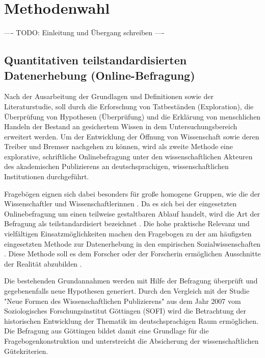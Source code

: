 \section{Methodenwahl}

---- TODO: Einleitung und Übergang schreiben ----

\subsection{Quantitativen teilstandardisierten Datenerhebung (Online-Befragung)}

Nach der Ausarbeitung der Grundlagen und Definitionen sowie der Literaturstudie, soll durch die Erforschung von Tatbeständen (Exploration), die Überprüfung von Hypothesen (Überprüfung) \cite{raab_2012_fragebogen} und die Erklärung von menschlichen Handeln \cite{atteslander_2008_methoden} der Bestand an gesichertem Wissen in dem Untersuchungsbereich erweitert \cite{bortz_Doering_2006_fragestellung} werden. Um der Entwicklung der Öffnung von Wissenschaft sowie deren Treiber und Bremser nachgehen zu können, wird als zweite Methode eine explorative, schriftliche Onlinebefragung unter den wissenschaftlichen Akteuren des akademischen Publizierens an deutschsprachigen, wissenschaftlichen Institutionen durchgeführt.

Fragebögen eignen sich dabei besonders für große homogene Gruppen, wie die der Wissenschaftler und Wissenschaftlerinnen \cite{suchen}. Da es sich bei der eingesetzten Onlinebefragung um einen teilweise gestaltbaren Ablauf handelt, wird die Art der Befragung als teilstandardisiert bezeichnet \cite{raab_2012_fragebogen}. Die hohe praktische Relevanz und vielfältigen Einsatzmöglichkeiten machen den Fragebogen zu der am häufigsten eingesetzten Methode zur Datenerhebung in den empirischen Sozialwissenschaften \cite{raab_2012_fragebogen}. Diese Methode soll es dem Forscher oder der Forscherin ermöglichen Ausschnitte der Realität abzubilden \cite{raab_2012_fragebogen}.

Die bestehenden Grundannahmen werden mit Hilfe der Befragung überprüft und gegebenenfalls neue Hypothesen generiert. Durch den Vergleich mit der Studie "Neue Formen des Wissenschaftlichen Publizierens" aus dem Jahr 2007 vom Soziologisches Forschungsinstitut Göttingen (SOFI) wird die Betrachtung der historischen Entwicklung der Thematik im deutschsprachigen Raum ermöglichen. Die Befragung aus Göttingen bildet damit eine Grundlage für die Fragebogenkonstruktion und unterstreicht die Absicherung der wissenschaftlichen Gütekriterien.

